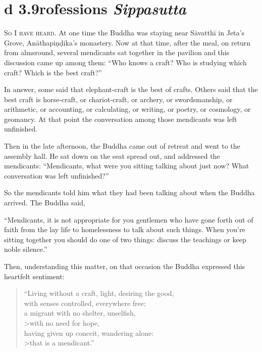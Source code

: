 \documentclass[12pt,openany]{book}%
\newcommand*{\suttatitleacronym}[1]{\smaller[2]{#1}\vspace*{.3em}}
\newcommand*{\suttatitletranslation}[1]{\linebreak{#1}}
\newcommand*{\suttatitleroot}[1]{\linebreak\smaller[2]\itshape{#1}}
\newcommand*{\tocacronym}[1]{\hspace*{-3.3em}{#1}\quad}
\newcommand*{\toctranslation}[1]{#1}
\newcommand*{\tocroot}[1]{(\textit{#1})}
\newcommand*{\scevam}[1]{\textsc{#1}}
\begin{document}
%
\section*{{\suttatitleacronym Ud 3.9}{\suttatitletranslation Professions }{\suttatitleroot Sippasutta}}
\addcontentsline{toc}{section}{\tocacronym{Ud 3.9} \toctranslation{Professions } \tocroot{Sippasutta}}

\scevam{So I have heard. }At one time the Buddha was staying near \textsanskrit{Sāvatthī} in Jeta’s Grove, \textsanskrit{Anāthapiṇḍika}’s monastery. Now at that time, after the meal, on return from almsround, several mendicants sat together in the pavilion and this discussion came up among them: “Who knows a craft? Who is studying which craft? Which is the best craft?” 

In answer, some said that elephant-craft is the best of crafts. Others said that the best craft is horse-craft, or chariot-craft, or archery, or swordsmanship, or arithmetic, or accounting, or calculating, or writing, or poetry, or cosmology, or geomancy. At that point the conversation among those mendicants was left unfinished. 

Then in the late afternoon, the Buddha came out of retreat and went to the assembly hall. He sat down on the seat spread out, and addressed the mendicants: “Mendicants, what were you sitting talking about just now? What conversation was left unfinished?” 

So the mendicants told him what they had been talking about when the Buddha arrived. The Buddha said, 

“Mendicants, it is not appropriate for you gentlemen who have gone forth out of faith from the lay life to homelessness to talk about such things. When you’re sitting together you should do one of two things: discuss the teachings or keep noble silence.” 

Then, understanding this matter, on that occasion the Buddha expressed this heartfelt sentiment: 

\begin{verse}%
“Living without a craft, light, desiring the good, \\
with senses controlled, everywhere free; \\
a migrant with no shelter, unselfish, \\>with no need for hope, \\
having given up conceit, wandering alone: \\>that is a mendicant.” 

%
\end{verse}
\end{document}
